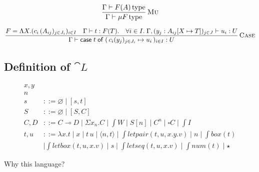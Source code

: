 $$
  \infrule[Mu]{
    \Gamma \vdash \istype{F(A)}
  }{\Gamma \vdash \istype{\mu F}}
$$

$$
  \infrule[Case]{F = \Lambda X . (c_i \, (A_{ij})_{j \in J_i})_{i \in I} \quad \Gamma \vdash t : F (T) . \quad \forall i \in I . \; \Gamma , (y_j : A_{ij}[X \mapsto T])_{j \in J} \vdash u_i : U}
  {\Gamma \vdash \caseof{t}\; (\,\case{c_i (y_j)_{j \in J_i}}{u_i}\,)_{i \in I} : U}
$$

\subsection{Definition of $\cat L$}

\begin{align*}
  x,y  \tag{variables}                                                                                                         \\
  n \tag{finite natural numbers, word size}                                                                                    \\
  s    & ::= \varnothing \mid [s, t] \tag{sequences}                                                                           \\
  S    & ::= \varnothing \mid [S, C] \tag{type sequences}                                                                      \\
  C, D & ::= C \multimap D \mid \Sigma x _{n} . C \mid \int{W} \mid S[n] \mid C ^n \mid \square C \mid \int{I} \tag{types}     \\
  t, u & ::= \lambda x . t \mid x \mid t\,u \mid \langle n, t \rangle \mid \int{letpair}(t, u, x.y.v) \mid n \mid \int{box}(t) \\
       & \mid \int{letbox}(t, u, x.v) \mid s \mid \int{letseq}(t, u, x.v) \mid \int{num}(t) \mid \star \tag{terms}
\end{align*}

Why this language?

